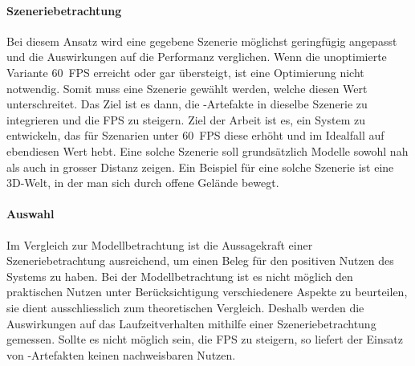 \paragraph{Szeneriebetrachtung}
Bei diesem Ansatz wird eine gegebene Szenerie möglichst geringfügig angepasst und die Auswirkungen auf die Performanz verglichen.
Wenn die unoptimierte Variante 60 \gls{FPS} erreicht oder gar übersteigt, ist eine Optimierung nicht notwendig. Somit muss eine Szenerie gewählt werden, welche diesen Wert unterschreitet.
Das Ziel ist es dann, die -Artefakte in dieselbe Szenerie zu integrieren und die \gls{FPS} zu steigern. Ziel der Arbeit ist es, ein System zu entwickeln, das für Szenarien unter 60 \gls{FPS} diese erhöht und im Idealfall auf ebendiesen Wert hebt.
Eine solche Szenerie soll grundsätzlich Modelle sowohl nah als auch in grosser Distanz zeigen. Ein Beispiel für eine solche Szenerie ist eine 3D-Welt, in der man sich durch offene Gelände bewegt.

\paragraph{Auswahl}
Im Vergleich zur Modellbetrachtung ist die Aussagekraft einer Szeneriebetrachtung ausreichend, um einen Beleg für den positiven Nutzen des Systems zu haben. Bei der Modellbetrachtung ist es nicht möglich den praktischen Nutzen unter Berücksichtigung verschiedenere Aspekte zu beurteilen, sie dient ausschliesslich zum theoretischen Vergleich. Deshalb werden die Auswirkungen auf das Laufzeitverhalten mithilfe einer Szeneriebetrachtung gemessen. Sollte es nicht möglich sein, die \gls{FPS} zu steigern, so liefert der Einsatz von -Artefakten keinen nachweisbaren Nutzen.
